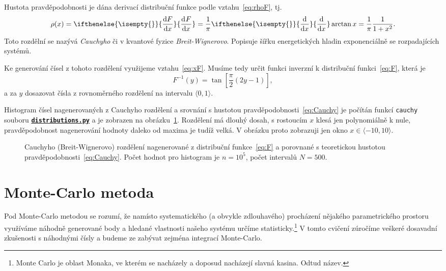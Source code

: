\documentclass[a4paper,11pt,twoside]{article}
\renewcommand{\d}{\mathrm{d}}
\newcommand{\derivative}[3][]{\ifthenelse{\isempty{#1}}	    %
	{\frac{\d{#2}}{\d{#3}}}
	{\frac{\d^{#1}{#2}}{\d{#3}^{#1}}}
}
\def\code#1{\textnormal{\texttt{#1}}}
\def\ghfile#1#2{\textnormal{\textbf{\texttt{\href{https://github.com/PavelStransky/PCInPhysics/blob/main/#1#2}{#2}}}}}
\theoremstyle{red}
\theoremstyle{green}
\begin{document}
    \begin{solution}
        Hustota pravděpodobnosti je dána derivací distribuční funkce podle vztahu~\eqref{eq:rhoF}, tj.
        \begin{equation}
            \label{eq:Cauchy}
            \rho(x)=\derivative{F}{x}=\frac{1}{\pi}\derivative{}{x}\arctan{x}=\frac{1}{\pi}\frac{1}{1+x^{2}}.
        \end{equation}
        Toto rozdělní se nazývá \emph{Cauchyho} či v kvantové fyzice \emph{Breit-Wignerovo}. 
        Popisuje šířku energetických hladin exponenciálně se rozpadajících systémů.

        Ke generování čísel z tohoto rozdělení využijeme vztahu~\eqref{eq:xF}.
        Musíme tedy určit funkci inverzní k distribuční funkci~\eqref{eq:F}, která je
        \begin{equation}
            F^{-1}(y)=\tan\left[\frac{\pi}{2}\left(2y-1\right)\right],
        \end{equation}
        a za $y$ dosazovat čísla z rovnoměrného rozdělení na intervalu $\langle0,1\rangle$.

        Histogram čísel nagenerovaných z Cauchyho rozdělení a srovnání s hustotou pravděpodobnosti~\eqref{eq:Cauchy} je počítán funkcí \code{cauchy} souboru \ghfile{python/histogram/}{distributions.py} a je zobrazen na obrázku~\ref{fig:F}.
        Rozdělení má dlouhý dosah, s rostoucím $x$ klesá jen polynomiálně k nule, pravděpodobnost nagenerování hodnoty daleko od maxima je tudíž velká. 
        V obrázku proto zobrazuji jen okno $x\in\langle-10,10\rangle$.

        \begin{figure}[!htb]
            \centering{}
            \caption{
                \protect\small
                Cauchyho (Breit-Wignerovo) rozdělení nagenerované z distribuční funkce~\eqref{eq:F} a porovnané s teoretickou hustotou pravděpodobnosti~\eqref{eq:Cauchy}.
                Počet hodnot pro histogram je $n=10^5$, počet intervalů $N=500$.
            }
            \label{fig:F}
        \end{figure}    
    \end{solution}

\section{Monte-Carlo metoda}
    Pod Monte-Carlo metodou se rozumí, že namísto systematického (a obvykle zdlouhavého) procházení nějakého parametrického prostoru využíváme náhodně generované body a hledané vlastnosti našeho systému určíme statisticky.\footnote{
        Monte Carlo je oblast Monaka, ve kterém se nacházely a doposud nacházejí slavná kasina.
        Odtud název.
    }
    V tomto cvičení zúročíme veškeré dosavadní zkušenosti s náhodnými čísly a budeme ze zabývat zejména integrací Monte-Carlo.
\end{document}
